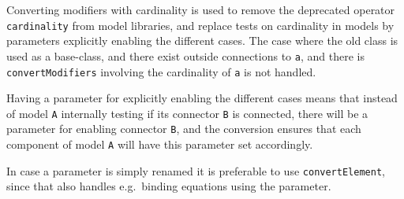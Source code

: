Converting modifiers with cardinality is used to remove the deprecated operator \lstinline!cardinality! from model libraries, and replace tests on cardinality in models by parameters explicitly enabling the different cases.  The case where the old class is used as a base-class, and there exist outside connections to \lstinline!a!, and there is \lstinline!convertModifiers! involving the cardinality of \lstinline!a! is not handled.

\begin{nonnormative}
Having a parameter for explicitly enabling the different cases means that instead of model \lstinline!A! internally testing if its
connector \lstinline!B! is connected, there will be a parameter for enabling connector \lstinline!B!, and the conversion ensures that
each component of model \lstinline!A! will have this parameter set accordingly.

In case a parameter is simply renamed it is preferable to use \lstinline!convertElement!, since that also handles e.g.\ binding equations
using the parameter.
\end{nonnormative}


